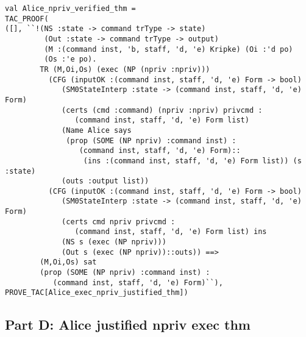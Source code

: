 \documentclass{article}
\begin{document}

\HOLSMZeroSolutionsTheoremsAliceXXnprivXXverifiedXXthm


\begin{verbatim}
val Alice_npriv_verified_thm =
TAC_PROOF(
([], ``!(NS :state -> command trType -> state)
         (Out :state -> command trType -> output)
         (M :(command inst, 'b, staff, 'd, 'e) Kripke) (Oi :'d po)
         (Os :'e po).
        TR (M,Oi,Os) (exec (NP (npriv :npriv)))
          (CFG (inputOK :(command inst, staff, 'd, 'e) Form -> bool)
             (SM0StateInterp :state -> (command inst, staff, 'd, 'e) Form)
             (certs (cmd :command) (npriv :npriv) privcmd :
                (command inst, staff, 'd, 'e) Form list)
             (Name Alice says
              (prop (SOME (NP npriv) :command inst) :
                 (command inst, staff, 'd, 'e) Form)::
                  (ins :(command inst, staff, 'd, 'e) Form list)) (s :state)
             (outs :output list))
          (CFG (inputOK :(command inst, staff, 'd, 'e) Form -> bool)
             (SM0StateInterp :state -> (command inst, staff, 'd, 'e) Form)
             (certs cmd npriv privcmd :
                (command inst, staff, 'd, 'e) Form list) ins
             (NS s (exec (NP npriv)))
             (Out s (exec (NP npriv))::outs)) ==>
        (M,Oi,Os) sat
        (prop (SOME (NP npriv) :command inst) :
           (command inst, staff, 'd, 'e) Form)``),
PROVE_TAC[Alice_exec_npriv_justified_thm])		   
\end{verbatim}

\subsection{Part D: Alice justified npriv exec thm}
\label{sec:part-d:-alice}


\HOLSMZeroSolutionsTheoremsAliceXXjustifiedXXnprivXXexecXXthm

\end{document}
